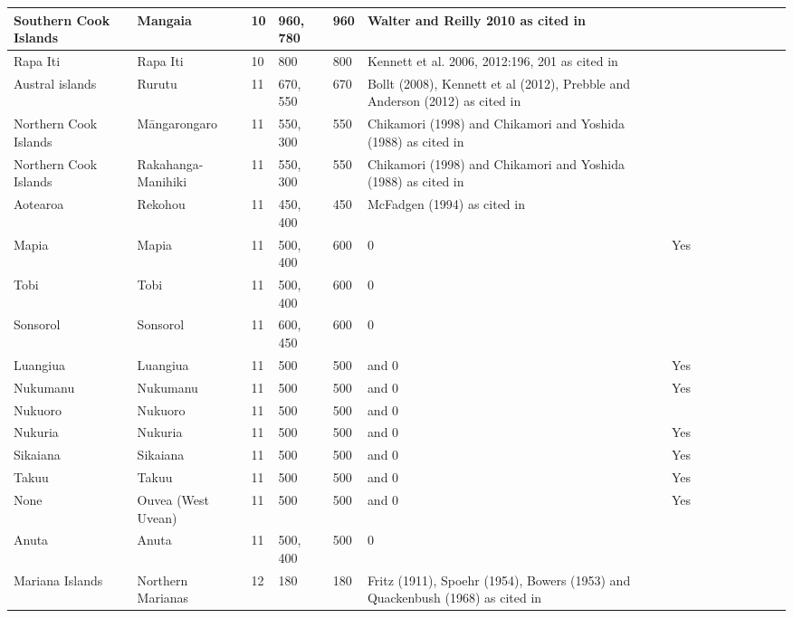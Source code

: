 \documentclass[draft,10pt]{article} %
\begin{document}
\begin{landscape}
\begin{longtable}{| p{3cm}| p{4cm}| p{4cm}|p{2cm}|p{2cm}|p{2cm}|p{2cm}|p{2cm}|p{2cm}|p{2cm}|p{2cm}|p{2cm}|p{2cm}|p{2cm}}
 Southern Cook Islands & Mangaia & 10 & 960, 780 & 960 & Walter and Reilly 2010 as cited in \citet{walworth2015} &   \\ \hline
 Rapa Iti & Rapa Iti & 10 & 800 & 800 & Kennett et al. 2006, 2012:196, 201 as cited in \citet{walworth2015} &   \\ \hline
 Austral islands & Rurutu & 11 & 670, 550 & 670 & Bollt (2008), Kennett et al (2012), Prebble and Anderson (2012) as cited in \citet{rieth_cochrane_2018} &   \\ \hline
 Northern Cook Islands & M\={a}ngarongaro & 11 & 550, 300 & 550 & Chikamori (1998) and Chikamori and Yoshida (1988) as cited in \citet{rieth_cochrane_2018} &   \\ \hline
 Northern Cook Islands & Rakahanga-Manihiki & 11 & 550, 300 & 550 & Chikamori (1998) and Chikamori and Yoshida (1988) as cited in \citet{rieth_cochrane_2018} &   \\ \hline
 Aotearoa & Rekohou & 11 & 450, 400 & 450 & McFadgen (1994) as cited in \citet{rieth_cochrane_2018} &   \\ \hline
 Mapia & Mapia & 11 & 500, 400 & 600 & \citet{intoh2007reconnaissance}  0 & Yes \\ \hline
 Tobi & Tobi & 11 & 500, 400 & 600 & \citet{intoh2007reconnaissance}  0 &   \\ \hline
 Sonsorol & Sonsorol & 11 & 600, 450 & 600 & \citet{intoh2008ongoing}  0 &   \\ \hline
 Luangiua & Luangiua & 11 & 500 & 500 & \citet{kirch2012basline} and \citet{carson2012recent}  0 & Yes \\ \hline
 Nukumanu & Nukumanu & 11 & 500 & 500 & \citet{kirch2012basline} and \citet{carson2012recent}  0 & Yes \\ \hline
 Nukuoro & Nukuoro & 11 & 500 & 500 & \citet{kirch2012basline} and \citet{carson2012recent}  0 &   \\ \hline
 Nukuria & Nukuria & 11 & 500 & 500 & \citet{kirch2012basline} and \citet{carson2012recent}  0 & Yes \\ \hline
 Sikaiana & Sikaiana & 11 & 500 & 500 & \citet{kirch2012basline} and \citet{carson2012recent}  0 & Yes \\ \hline
 Takuu & Takuu & 11 & 500 & 500 & \citet{kirch2012basline} and \citet{carson2012recent}  0 & Yes \\ \hline
 None & Ouvea (West Uvean) & 11 & 500 & 500 & \citet{kirch2012basline} and \citet{carson2012recent}  0 & Yes \\ \hline
 Anuta & Anuta & 11 & 500, 400 & 500 & \citet{carson2012recent}  0 &   \\ \hline
 Mariana Islands & Northern Marianas & 12 & 180 & 180 & Fritz (1911), Spoehr (1954), Bowers (1953) and Quackenbush (1968) as cited in \citet{ellis2012saipan} &   \\ \hline




 \end{longtable}
\end{landscape}
\end{document}
